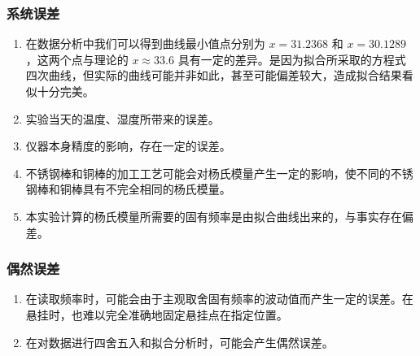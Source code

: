 \documentclass[a4paper,utf8]{article}
\begin{document}
\subsubsection{系统误差}
\begin{enumerate}
    \item 在数据分析中我们可以得到曲线最小值点分别为 $x=31.2368$ 和 $x=30.1289$，这两个点与理论的 $x \approx 33.6$ 具有一定的差异。是因为拟合所采取的方程式四次曲线，但实际的曲线可能并非如此，甚至可能偏差较大，造成拟合结果看似十分完美。
    \item 实验当天的温度、湿度所带来的误差。
    \item 仪器本身精度的影响，存在一定的误差。
    \item 不锈钢棒和铜棒的加工工艺可能会对杨氏模量产生一定的影响，使不同的不锈钢棒和铜棒具有不完全相同的杨氏模量。
    \item 本实验计算的杨氏模量所需要的固有频率是由拟合曲线出来的，与事实存在偏差。
\end{enumerate}
\subsubsection{偶然误差}
\begin{enumerate}
    \item 在读取频率时，可能会由于主观取舍固有频率的波动值而产生一定的误差。在悬挂时，也难以完全准确地固定悬挂点在指定位置。
    \item 在对数据进行四舍五入和拟合分析时，可能会产生偶然误差。
\end{enumerate}
\end{document}
